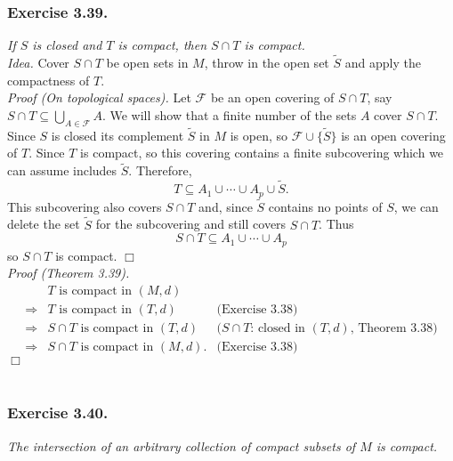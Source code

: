 \documentclass{article}
\begin{document}



\subsubsection*{Exercise 3.39.}
\emph{If $S$ is closed and $T$ is compact, then $S \cap T$ is compact.} \\

\emph{Idea.}
Cover $S \cap T$ be open sets in $M$, throw in the open set $\widetilde{S}$
and apply the compactness of $T$. \\

\emph{Proof (On topological spaces).}
Let $\mathscr{F}$ be an open covering of $S \cap T$, say
$S \cap T \subseteq \bigcup_{A \in \mathscr{F}}A$.
We will show that a finite number of the sets $A$ cover $S \cap T$.
Since $S$ is closed its complement $\widetilde{S}$ in $M$ is open,
so $\mathscr{F} \cup \{ \widetilde{S} \}$ is an open covering of $T$.
Since $T$ is compact, so this covering contains a finite subcovering
which we can assume includes $\widetilde{S}$.
Therefore,
$$T \subseteq A_1 \cup \cdots \cup A_p \cup \widetilde{S}.$$
This subcovering also covers $S \cap T$ and, since $\widetilde{S}$ contains no points of $S$,
we can delete the set $\widetilde{S}$ for the subcovering and still covers $S \cap T$.
Thus
$$S \cap T \subseteq A_1 \cup \cdots \cup A_p$$
so $S \cap T$ is compact.
$\Box$ \\

\emph{Proof (Theorem 3.39).}
\begin{align*}
&\text{$T$ is compact in $(M,d)$} \\
\Longrightarrow&
\text{$T$ is compact in $(T,d)$}
  &\text{(Exercise 3.38)} \\
\Longrightarrow&
\text{$S \cap T$ is compact in $(T,d)$}
  &\text{($S \cap T$: closed in $(T,d)$, Theorem 3.38)} \\
\Longrightarrow&
\text{$S \cap T$ is compact in $(M,d)$}.
  &\text{(Exercise 3.38)}
\end{align*}
$\Box$ \\\\






\subsubsection*{Exercise 3.40.}
\emph{The intersection of an arbitrary collection of compact subsets of $M$ is compact.} \\
\end{document}
